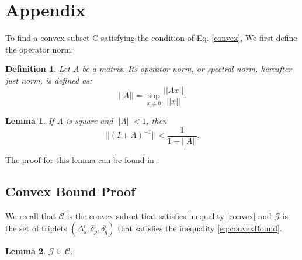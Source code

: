 \documentclass{sig-alternate-05-2015}
\newtheorem{lemma}{Lemma}
\newtheorem{definition}{Definition}
\begin{document}
\appendix
\section{Appendix} \label{AppendixA}
To find a convex subset C satisfying the condition of Eq. \ref{convex},
We first define the operator norm:
\begin{definition}
Let $A$ be a matrix. Its operator norm, or
spectral norm, hereafter just norm, is defined as:
\begin{equation*}
||A|| = \sup_{x \neq 0}\frac{||Ax||}{||x||}.
\end{equation*}
\end{definition}

\begin{lemma} \label{lemma:newman}
If A is square and $||A|| < 1$, then
\begin{equation*}
||(I+A)^{-1}|| < \frac{1}{1-||A||}.
\end{equation*}
\end{lemma}
The proof for this lemma can be found in \cite{gabel2015monitoring}.

\subsection{Convex Bound Proof}
We recall that $\mathcal{C}$ is the convex subset that satisfies 
inequality \ref{convex} and $\mathcal{G}$ is the set of triplets 
$(\Delta_s^i, \delta_p^i, \delta_q^i)$
 that satisfies the inequality \ref{eq:convexBound}.

\begin{lemma}
$\mathcal{G} \subseteq \mathcal{C}$:
\end{lemma}
\end{document}

